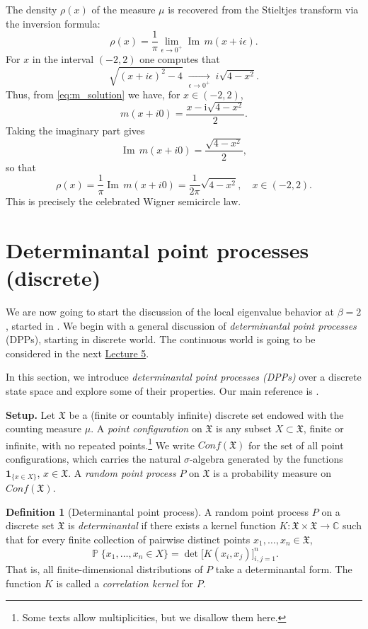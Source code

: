 \documentclass[letterpaper,11pt,oneside,reqno]{article}
\numberwithin{equation}{section}
\theoremstyle{definition}
\newtheorem{definition}[proposition]{Definition}
\begin{document}
The density \(\rho(x)\) of the measure \(\mu\) is recovered from the Stieltjes transform via the inversion formula:
\[
\rho(x)=\frac{1}{\pi}\lim_{\epsilon\to0^+}\operatorname{Im}\,m(x+i\epsilon).
\]
For \(x\) in the interval \((-2,2)\) one computes that
\[
\sqrt{(x+i\epsilon)^2-4}\;\xrightarrow[\epsilon\to0^+]{}\; i\sqrt{4-x^2}.
\]
Thus, from \eqref{eq:m_solution} we have, for \(x\in(-2,2)\),
\[
m(x+i0)=\frac{x-\mathrm{i}\sqrt{4-x^2}}{2}.
\]
Taking the imaginary part gives
\[
\operatorname{Im}\,m(x+i0)=\frac{\sqrt{4-x^2}}{2},
\]
so that
\[
\rho(x)=\frac{1}{\pi}\operatorname{Im}\,m(x+i0)=\frac{1}{2\pi}\sqrt{4-x^2},\quad x\in(-2,2).
\]
This is precisely the celebrated Wigner semicircle law.



\section{Determinantal point processes (discrete)}
\label{sec:determinantal}

We are now going to start the discussion of the local eigenvalue
behavior at $\beta=2$, started in .
We begin with a general discussion of \emph{determinantal point processes} (DPPs),
starting in discrete world. The continuous world is going to be considered in the next
\href{https://lpetrov.cc/rmt25/rmt25-notes/rmt2025-l05.pdf}{Lecture 5}.

In this section, we introduce \emph{determinantal point processes (DPPs)}
over a discrete state space and explore some of their properties.
Our main reference is \cite{Borodin2009}.

\medskip

\noindent\textbf{Setup.} Let \(\mathfrak{X}\) be a (finite or countably infinite)
discrete set endowed with the counting measure \(\mu\).
A \emph{point configuration} on \(\mathfrak{X}\) is any subset \(X\subset \mathfrak{X}\),
finite or infinite, with no repeated points.\footnote{Some texts allow
multiplicities, but we disallow them here.}
We write \(Conf(\mathfrak{X})\) for the set of all point configurations,
which carries the natural \(\sigma\)-algebra generated by the functions
\(\mathbf{1}_{\{x\in X\}}\), \(x\in\mathfrak{X}\). A \emph{random point process} \(P\)
on \(\mathfrak{X}\) is a probability measure on \(Conf(\mathfrak{X})\).

\begin{definition}[Determinantal point process]
\label{def:dpp-discrete}
A random point process \(P\) on a discrete set \(\mathfrak{X}\) is \emph{determinantal}
if there exists a kernel function \(K:\mathfrak{X}\times\mathfrak{X} \to \mathbb{C}\) such that
for every finite collection of pairwise distinct points \(x_1,\dots,x_n\in \mathfrak{X}\),
\begin{equation}
\label{eq:DPP-def}
\operatorname{\mathbb{P}}\{x_1,\dots,x_n\in X\} = \det\bigl[K(x_i,x_j)\bigr]_{i,j=1}^n.
\end{equation}
That is, all finite-dimensional distributions of \(P\) take a determinantal form.
The function \(K\) is called a \emph{correlation kernel} for \(P\).
\end{definition}
\end{document}
